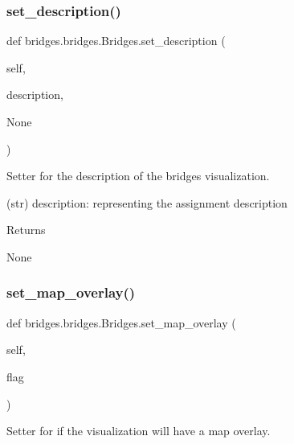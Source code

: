 \mbox{\label{classbridges_1_1bridges_1_1_bridges_aba86088c031b505bbe88dbc530bf1331}} 
\subsubsection{\texorpdfstring{set\+\_\+description()}{set\_description()}}
{\footnotesize\ttfamily def bridges.\+bridges.\+Bridges.\+set\+\_\+description (\begin{DoxyParamCaption}\item[{}]{self,  }\item[{}]{description,  }\item[{}]{None }\end{DoxyParamCaption})}



Setter for the description of the bridges visualization. 

(str) description\+: representing the assignment description \begin{DoxyReturn}{Returns}


None 
\end{DoxyReturn}
\mbox{\label{classbridges_1_1bridges_1_1_bridges_ae9ed34b5878d9d120949da0b7e4d2911}} 
\subsubsection{\texorpdfstring{set\+\_\+map\+\_\+overlay()}{set\_map\_overlay()}}
{\footnotesize\ttfamily def bridges.\+bridges.\+Bridges.\+set\+\_\+map\+\_\+overlay (\begin{DoxyParamCaption}\item[{}]{self,  }\item[{}]{flag }\end{DoxyParamCaption})}



Setter for if the visualization will have a map overlay. 

